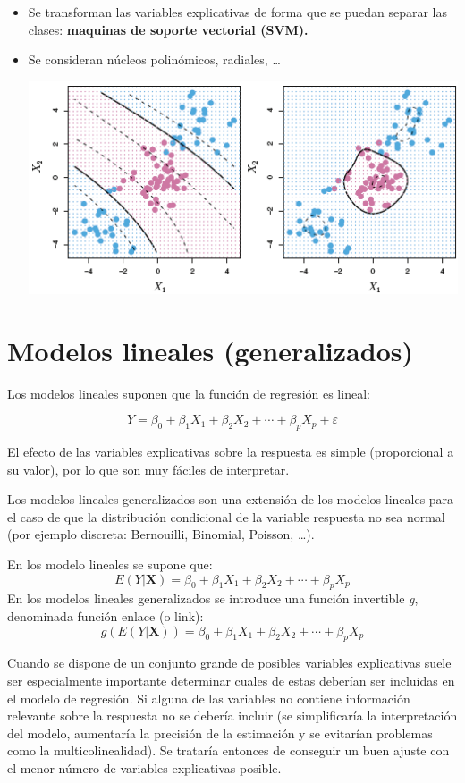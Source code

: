 \documentclass[]{book}
\begin{document}
\begin{itemize}
\item
  Se transforman las variables explicativas de forma que se puedan
  separar las clases: \textbf{maquinas de soporte vectorial (SVM).}
\item
  Se consideran núcleos polinómicos, radiales, \ldots{}

  \includegraphics[width=6.72in]{images/svm4}
\end{itemize}

\hypertarget{modelos-lineales-generalizados}{%
\section{Modelos lineales (generalizados)}\label{modelos-lineales-generalizados}}

Los modelos lineales suponen que la función de regresión es lineal:

\[Y=\beta_{0}+\beta_{1}X_{1}+\beta_{2}X_{2}+\cdots+\beta_{p}X_{p}+\varepsilon\]

El efecto de las variables explicativas sobre la respuesta es simple
(proporcional a su valor), por lo que son muy fáciles de interpretar.

Los modelos lineales generalizados son una extensión de los modelos lineales
para el caso de que la distribución condicional de la variable respuesta no
sea normal (por ejemplo discreta: Bernouilli, Binomial, Poisson, \ldots{}).

En los modelo lineales se supone que:
\[E( Y | \mathbf{X} ) = \beta_{0}+\beta_{1}X_{1}+\beta_{2}X_{2}+\cdots+\beta_{p}X_{p}\]
En los modelos lineales generalizados se introduce una función invertible \emph{g}, denominada función enlace (o link):
\[g\left(E(Y | \mathbf{X} )\right) = \beta_{0}+\beta_{1}X_{1}+\beta_{2}X_{2}+\cdots+\beta_{p}X_{p}\]

Cuando se dispone de un conjunto grande de posibles variables explicativas
suele ser especialmente importante determinar cuales de estas deberían ser
incluidas en el modelo de regresión. Si alguna de las variables no contiene
información relevante sobre la respuesta no se debería incluir (se simplificaría
la interpretación del modelo, aumentaría la precisión de la estimación y se
evitarían problemas como la multicolinealidad). Se trataría entonces de conseguir
un buen ajuste con el menor número de variables explicativas posible.
\end{document}
